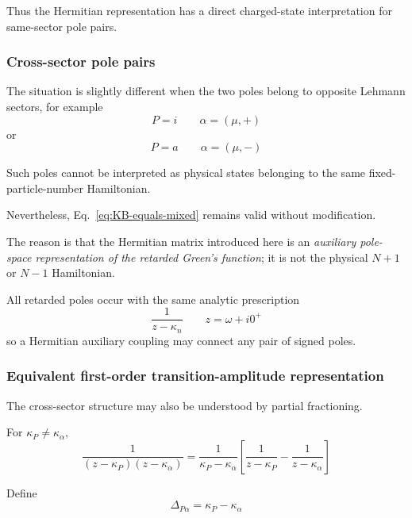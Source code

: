 \documentclass[aip,jcp,reprint,noshowkeys,superscriptaddress]{revtex4-1}
\begin{document}
Thus the Hermitian representation has a direct charged-state
interpretation for same-sector pole pairs.


\subsubsection{Cross-sector pole pairs}

The situation is slightly different when the two poles belong to
opposite Lehmann sectors, for example
\begin{equation}
  P=i
  \qquad
  \alpha=(\mu,+)
\end{equation}
or
\begin{equation}
  P=a
  \qquad
  \alpha=(\mu,-)
\end{equation}

Such poles cannot be interpreted as physical states belonging to the
same fixed-particle-number Hamiltonian.

Nevertheless, Eq.~\eqref{eq:KB-equals-mixed} remains valid without
modification.

The reason is that the Hermitian matrix introduced here is an
\emph{auxiliary pole-space representation of the retarded Green's
function}; it is not the physical $N+1$ or $N-1$ Hamiltonian.

All retarded poles occur with the same analytic prescription
\begin{equation}
  \frac{1}{z-\kappa_n}
  \qquad
  z=\omega+i0^+
\end{equation}
so a Hermitian auxiliary coupling may connect any pair of signed poles.


\subsubsection{Equivalent first-order transition-amplitude representation}

The cross-sector structure may also be understood by partial
fractioning.

For $\kappa_P\neq\kappa_\alpha$,
\begin{equation}
  \frac{1}{
    (z-\kappa_P)
    (z-\kappa_\alpha)
  }
  =
  \frac{1}{
    \kappa_P-\kappa_\alpha
  }
  \left[
    \frac{1}{z-\kappa_P}
    -
    \frac{1}{z-\kappa_\alpha}
  \right]
  \label{eq:cross-partial-fraction}
\end{equation}

Define
\begin{equation}
  \Delta_{P\alpha}
  =
  \kappa_P-\kappa_\alpha
\end{equation}
\end{document}
